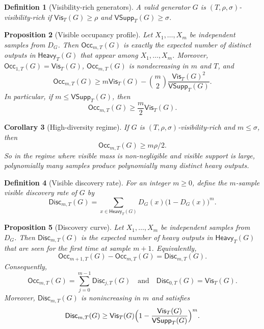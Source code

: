\documentclass[11pt]{article}
\newtheorem{definition}{Definition}[section]
\newtheorem{proposition}[definition]{Proposition}
\newtheorem{corollary}[definition]{Corollary}
\theoremstyle{remark}
\theoremstyle{definition}
\begin{document}
\begin{definition}[Visibility-rich generators]
A valid generator $G$ is $(T,\rho,\sigma)$-visibility-rich if $\mathsf{Vis}_T(G) \ge \rho$ and $\mathsf{VSupp}_T(G) \ge \sigma$.
\end{definition}

\begin{proposition}[Visible occupancy profile]
Let $X_1,\dots,X_m$ be independent samples from $D_G$. Then $\mathsf{Occ}_{m,T}(G)$ is exactly the expected number of distinct outputs in $\mathsf{Heavy}_T(G)$ that appear among $X_1,\dots,X_m$.
Moreover, $\mathsf{Occ}_{1,T}(G)=\mathsf{Vis}_T(G)$, $\mathsf{Occ}_{m,T}(G)$ is nondecreasing in $m$ and $T$, and
\[
\mathsf{Occ}_{m,T}(G) \ge m\mathsf{Vis}_T(G) - \binom{m}{2}\frac{\mathsf{Vis}_T(G)^2}{\mathsf{VSupp}_T(G)}.
\]
In particular, if $m \le \mathsf{VSupp}_T(G)$, then
\[
\mathsf{Occ}_{m,T}(G) \ge \frac{m}{2}\mathsf{Vis}_T(G).
\]
\end{proposition}

\begin{corollary}[High-diversity regime]
If $G$ is $(T,\rho,\sigma)$-visibility-rich and $m \le \sigma$, then
\[
\mathsf{Occ}_{m,T}(G) \ge m\rho/2.
\]
So in the regime where visible mass is non-negligible and visible support is large, polynomially many samples produce polynomially many distinct heavy outputs.
\end{corollary}

\begin{definition}[Visible discovery rate]
For an integer $m \ge 0$, define the $m$-sample visible discovery rate of $G$ by
\[
\mathsf{Disc}_{m,T}(G) = \sum_{x \in \mathsf{Heavy}_T(G)} D_G(x)\bigl(1 - D_G(x)\bigr)^m.
\]
\end{definition}

\begin{proposition}[Discovery curve]
Let $X_1,\dots,X_m$ be independent samples from $D_G$. Then $\mathsf{Disc}_{m,T}(G)$ is the expected number of heavy outputs in $\mathsf{Heavy}_T(G)$ that are seen for the first time at sample $m+1$. Equivalently,
\[
\mathsf{Occ}_{m+1,T}(G) - \mathsf{Occ}_{m,T}(G) = \mathsf{Disc}_{m,T}(G).
\]
Consequently,
\[
\mathsf{Occ}_{m,T}(G)=\sum_{j=0}^{m-1}\mathsf{Disc}_{j,T}(G)
\quad\text{and}\quad
\mathsf{Disc}_{0,T}(G)=\mathsf{Vis}_T(G).
\]
Moreover, $\mathsf{Disc}_{m,T}(G)$ is nonincreasing in $m$ and satisfies
\[
\mathsf{Disc}_{m,T}(G) \ge \mathsf{Vis}_T(G)\Bigl(1-\frac{\mathsf{Vis}_T(G)}{\mathsf{VSupp}_T(G)}\Bigr)^m.
\]
\end{proposition}
\end{document}
